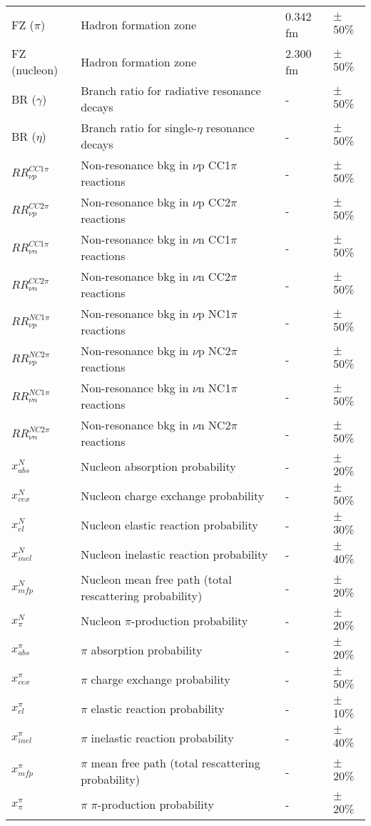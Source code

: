 \documentclass{article}
\begin{document}
\begin{table*}
\begin{tabular}{| l | l | l | l |}
FZ ($\pi$)  & Hadron formation zone & 0.342 fm & $\pm$50\% \\
FZ (nucleon)  & Hadron formation zone & 2.300 fm & $\pm$50\% \\
BR ($\gamma$)  & Branch ratio for radiative resonance decays & - & $\pm$50\% \\
BR ($\eta$)  & Branch ratio for single-$\eta$ resonance decays & - & $\pm$50\% \\ \hline

$RR_{\nu p}^{CC1\pi}$ & Non-resonance bkg in $\nu$p CC1$\pi$ reactions & - & $\pm$50\% \\ 
$RR_{\nu p}^{CC2\pi}$ & Non-resonance bkg in $\nu$p CC2$\pi$ reactions & - & $\pm$50\% \\ 
$RR_{\nu n}^{CC1\pi}$ & Non-resonance bkg in $\nu$n CC1$\pi$ reactions & - & $\pm$50\% \\ 
$RR_{\nu n}^{CC2\pi}$ & Non-resonance bkg in $\nu$n CC2$\pi$ reactions & - & $\pm$50\% \\ 
$RR_{\nu p}^{NC1\pi}$ & Non-resonance bkg in $\nu$p NC1$\pi$ reactions & - & $\pm$50\% \\ 
$RR_{\nu p}^{NC2\pi}$ & Non-resonance bkg in $\nu$p NC2$\pi$ reactions & - & $\pm$50\% \\ 
$RR_{\nu n}^{NC1\pi}$ & Non-resonance bkg in $\nu$n NC1$\pi$ reactions & - & $\pm$50\% \\ 
$RR_{\nu n}^{NC2\pi}$ & Non-resonance bkg in $\nu$n NC2$\pi$ reactions & - & $\pm$50\% \\  \hline

$x_{abs}^{N}$ & Nucleon absorption probability & - & $\pm$20\% \\ 
$x_{cex}^{N}$ & Nucleon charge exchange probability & - & $\pm$50\% \\ 
$x_{el}^{N}$ & Nucleon elastic reaction probability & - & $\pm$30\% \\ 
$x_{inel}^{N}$ & Nucleon inelastic reaction probability & - & $\pm$40\% \\ 
$x_{mfp}^{N}$ & Nucleon mean free path (total rescattering probability) & - & $\pm$20\% \\
$x_{\pi}^{N}$ & Nucleon $\pi$-production probability & - & $\pm$20\% \\
$x_{abs}^{\pi}$ & $\pi$ absorption probability & - & $\pm$20\% \\
$x_{cex}^{\pi}$ & $\pi$ charge exchange probability & - & $\pm$50\% \\
$x_{el}^{\pi}$ & $\pi$ elastic reaction probability & - & $\pm$10\% \\
$x_{inel}^{\pi}$ & $\pi$ inelastic reaction probability & - & $\pm$40\% \\
$x_{mfp}^{\pi}$ & $\pi$ mean free path (total rescattering probability) & - & $\pm$20\% \\
$x_{\pi}^{\pi}$ & $\pi$ $\pi$-production probability & - & $\pm$20\% \\ \hline
\end{tabular}
\end{table*}
\end{document}
